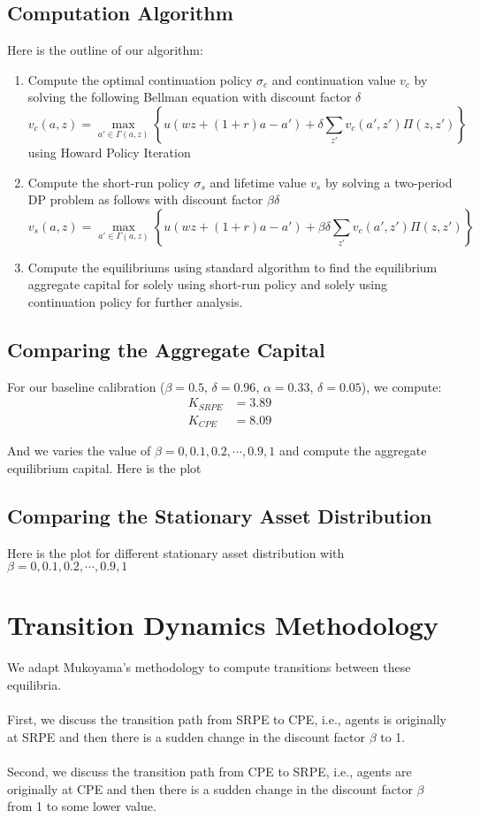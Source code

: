 \documentclass[11pt,a4paper]{article}
\begin{document}
\subsection{Computation Algorithm}
Here is the outline of our algorithm:
\begin{enumerate}
    \item Compute the optimal continuation policy $\sigma_c$ and continuation value $v_c$ by solving the following Bellman equation with discount factor $\delta$
    $$
    v_c(a,z) = \max_{a' \in \Gamma(a,z)} \left\{u(wz + (1+r)a - a') + \delta \sum_{z'} v_c(a',z')\Pi(z,z')\right\}
    $$
    using Howard Policy Iteration
    \item Compute the short-run policy $\sigma_s$ and lifetime value $v_s$ by solving a two-period DP problem as follows with discount factor $\beta\delta$
    $$
    v_s (a,z) = \max_{a'\in\Gamma(a,z)} \left\{u(wz + (1+r)a - a') + \beta\delta \sum_{z'} v_c(a',z')\Pi(z,z') \right\}
    $$
    \item Compute the equilibriums using standard algorithm to find the equilibrium aggregate capital for solely using short-run policy and solely using continuation policy for further analysis. 
\end{enumerate}

\subsection{Comparing the Aggregate Capital}
\noindent For our baseline calibration ($\beta=0.5$, $\delta=0.96$, $\alpha=0.33$, $\delta=0.05$), we compute:
\begin{align}
K_{SRPE} &= 3.89\\
K_{CPE} &= 8.09
\end{align}

\noindent And we varies the value of $\beta = 0, 0.1, 0.2, \cdots, 0.9, 1$ and compute the aggregate equilibrium capital. Here is the plot

\subsection{Comparing the Stationary Asset Distribution}
Here is the plot for different stationary asset distribution  with $\beta = 0, 0.1, 0.2, \cdots, 0.9, 1$
\section{Transition Dynamics Methodology}
We adapt Mukoyama's methodology to compute transitions between these equilibria.\\
\\
First, we discuss the transition path from SRPE to CPE, i.e., agents is originally at SRPE and then there is a sudden change in the discount factor $\beta$ to 1.\\
\\
Second, we discuss the transition path from CPE to SRPE, i.e., agents are originally at CPE and then there is a sudden change in the discount factor $\beta$  from  1 to some lower value.\\
\\
\end{document}
